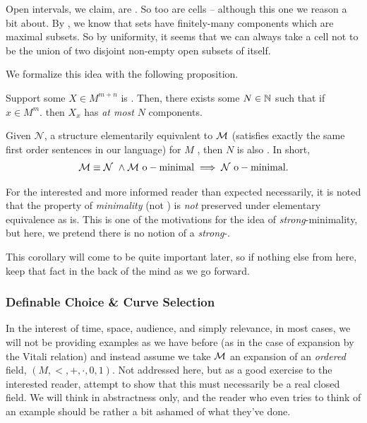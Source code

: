 \begin{example}
  Open intervals, we claim, are . So too are cells -- although this one we reason a bit about. By \CD, we know that  sets have finitely-many  components which are maximal  \cnctd subsets. So by uniformity, it seems that we can always take a cell not to be the union of two disjoint non-empty  open subsets of itself.

\end{example}

We formalize this idea with the following proposition.

\begin{proposition}
  \label{prop:dfnblycnctd}
  Support some $X \in M^{m + n}$ is . Then, there exists some $N \in \mathbb{N}$ such that if $x \in M^m$. then $X_x$ has \emph{at most} $N$  components.
\end{proposition}

\begin{corollary}
  Given $\mathcal{N}$, a structure elementarily equivalent to $\mathcal{M}$ (satisfies exactly the same first order sentences in our language) for $M$ \om, then $N$ is also \om. In short,
  \begin{align*}
    \mathcal{M} \equiv \mathcal{N} \ \wedge \mathcal{M} \ \mathrm{o-minimal} \implies \mathcal{N} \ \mathrm{o-minimal}.
  \end{align*}
\end{corollary}

\begin{svgraybox}
  For the interested and more informed reader than expected necessarily, it is noted that the property of \emph{minimality} (not \omy) is \emph{not} preserved under elementary equivalence as \omy is. This is one of the motivations for the idea of \emph{strong}-minimality, but here, we pretend there is no notion of a \emph{strong}-\omy.
\end{svgraybox}

This corollary will come to be quite important later, so if nothing else from here, keep that fact in the back of the mind as we go forward.

\subsubsection{Definable Choice \& Curve Selection}
\noindent In the interest of time, space, audience, and simply relevance, in most cases, we will not be providing examples as we have before (as in the case of expansion by the Vitali relation) and instead assume we take $\mathcal{M}$ an \om expansion of an \emph{ordered} field, $(M, <, +, \cdot, 0, 1)$. Not addressed here, but as a good exercise to the interested reader, attempt to show that this must necessarily be a real closed field. We will think in abstractness only, and the reader who even tries to think of an example should be rather a bit ashamed of what they've done.

